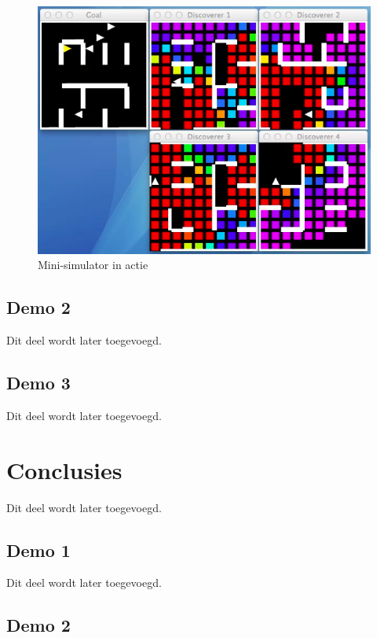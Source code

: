 \documentclass[12pt,a4paper]{report}
\begin{document}
\begin{figure}[htbp]
  \centering
  \includegraphics[width=150mm]{resources/mini-simulator.png}
  \caption{Mini-simulator in actie}
  \label{fig:mini-simulator}
\end{figure}

\section{Demo 2}

Dit deel wordt later toegevoegd.

\section{Demo 3}

Dit deel wordt later toegevoegd.

\chapter{Conclusies}

Dit deel wordt later toegevoegd.

\section{Demo 1}

Dit deel wordt later toegevoegd.

\section{Demo 2}
\end{document}
